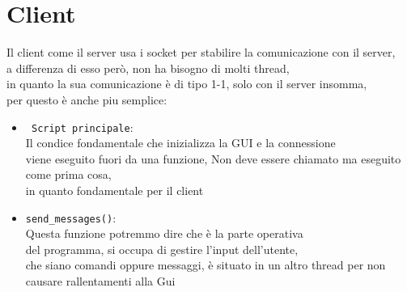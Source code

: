 \documentclass[a4paper,12pt]{report}
\begin{document}
\chapter*{Client}
Il client come il server usa i socket per 
stabilire la comunicazione con il server,\\ a differenza di esso però, non ha bisogno di molti thread,\\
in quanto la sua comunicazione è di tipo 1-1, solo con il server insomma,\\
per questo è anche piu semplice:
\begin{itemize}
    \item \texttt{ Script principale}:\\
Il condice fondamentale che inizializza la GUI e la connessione\\
viene eseguito fuori da una funzione, Non deve essere chiamato ma eseguito come prima cosa,\\in quanto fondamentale per il client
    \item \texttt{send\_messages()}:\\
Questa funzione potremmo dire che è la parte operativa\\ del programma,
si occupa di gestire l'input dell'utente,\\che siano comandi oppure messaggi,
è situato in un altro thread per non causare rallentamenti alla Gui
\end{itemize}
\end{document}
